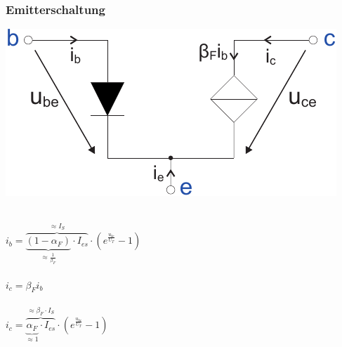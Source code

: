 \documentclass[a4paper,twocolumn,10pt]{article}
\begin{document}
\subsubsection*{Emitterschaltung}
\begin{minipage}[b]{0.23\textwidth}
\includegraphics[width=\textwidth]{Grafiken/Emitterschaltung_Vereinfachung}\\\\
\end{minipage}
\hfill
\begin{minipage}[b]{0.23\textwidth}
$i_b=\overbrace{\underbrace{(1-\alpha_F)}_{\approx \frac{1}{\beta_F}}\cdot I_{es}}^{\approx I_S}\cdot (e^{\frac{u_{be}}{U_T}}-1)$\\\\
$i_c=\beta_Fi_b$\\\\
$i_c=\overbrace{\underbrace{\alpha_F}_{\approx 1}\cdot I_{es}}^{\approx \beta_F\cdot I_S}\cdot (e^{\frac{u_{be}}{U_T}}-1)$\\
\end{minipage}
\end{document}
